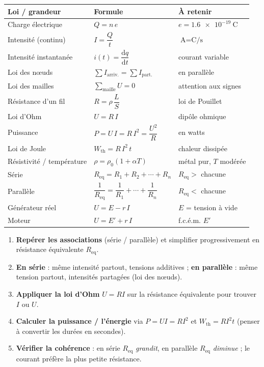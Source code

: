 \documentclass[11pt,a4paper]{article}
\newcommand{\dd}{\mathrm{d}}
\newcommand{\Req}{R_{\mathrm{eq}}}
\begin{document}
\begin{center}
\renewcommand{\arraystretch}{1.55}
\begin{tabular}{>{\raggedright\arraybackslash}p{4.4cm} >{\centering\arraybackslash}p{5.4cm} >{\raggedright\arraybackslash}p{4.7cm}}
\rowcolor{primary!18}
\textbf{Loi / grandeur} & \textbf{Formule} & \textbf{À retenir} \\
\midrule
Charge électrique & $Q = n\,e$ & $e=\SI{1,6e-19}{\coulomb}$ \\
Intensité (continu) & $I = \dfrac{Q}{t}$ & $\si{\ampere}=\si{\coulomb\per\second}$ \\
Intensité instantanée & $i(t) = \dfrac{\dd q}{\dd t}$ & courant variable \\
Loi des nœuds & $\sum I_{\text{arriv.}}=\sum I_{\text{part.}}$ & en parallèle \\
Loi des mailles & $\sum_{\text{maille}} U = 0$ & attention aux signes \\
Résistance d'un fil & $R = \rho\,\dfrac{L}{S}$ & loi de Pouillet \\
Loi d'Ohm & $U = R\,I$ & dipôle ohmique \\
Puissance & $P = U\,I = R\,I^{2} = \dfrac{U^{2}}{R}$ & en watts \\
Loi de Joule & $W_{\mathrm{th}} = R\,I^{2}\,t$ & chaleur dissipée \\
Résistivité / température & $\rho=\rho_0(1+\alpha T)$ & métal pur, $T$ modérée \\
Série & $\Req = R_1+R_2+\cdots+R_n$ & $\Req>$ chacune \\
Parallèle & $\dfrac{1}{\Req}=\dfrac{1}{R_1}+\cdots+\dfrac{1}{R_n}$ & $\Req<$ chacune \\
Générateur réel & $U = E - r\,I$ & $E$ = tension à vide \\
Moteur & $U = E' + r\,I$ & f.c.é.m. $E'$ \\
\bottomrule
\end{tabular}
\end{center}

\begin{methode}
\begin{enumerate}[leftmargin=1.8em,topsep=2pt,itemsep=1pt]
  \item \textbf{Repérer les associations} (série / parallèle) et simplifier progressivement en
        résistance équivalente $\Req$.
  \item \textbf{En série} : même intensité partout, tensions additives ; \textbf{en parallèle} :
        même tension partout, intensités partagées (loi des nœuds).
  \item \textbf{Appliquer la loi d'Ohm} $U=RI$ sur la résistance équivalente pour trouver $I$ ou $U$.
  \item \textbf{Calculer la puissance / l'énergie} via $P=UI=RI^2$ et $W_{\mathrm{th}}=RI^2t$ (penser
        à convertir les durées en secondes).
  \item \textbf{Vérifier la cohérence} : en série $\Req$ \emph{grandit}, en parallèle $\Req$
        \emph{diminue} ; le courant préfère la plus petite résistance.
\end{enumerate}
\end{methode}
\end{document}
